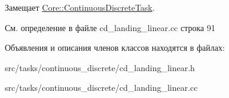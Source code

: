 Замещает \hyperlink{class_core_1_1_continuous_discrete_task_a961cc49fd0c72ba0a211bb4913ca3ece}{Core\+::\+Continuous\+Discrete\+Task}.



См. определение в файле cd\+\_\+landing\+\_\+linear.\+cc строка 91



Объявления и описания членов классов находятся в файлах\+:\begin{DoxyCompactItemize}
\item 
src/tasks/continuous\+\_\+discrete/cd\+\_\+landing\+\_\+linear.\+h\item 
src/tasks/continuous\+\_\+discrete/cd\+\_\+landing\+\_\+linear.\+cc\end{DoxyCompactItemize}
